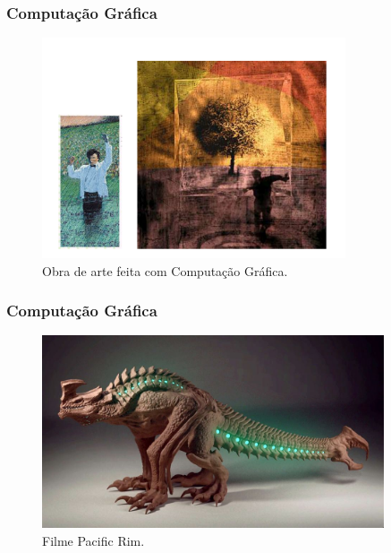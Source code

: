 \documentclass{beamer}
\begin{document}


\begin{frame}
\frametitle{Computação Gráfica}

	\begin{figure}[!h]
		\begin{center}
			\includegraphics[width=0.8\textwidth]{Figures/arte}
			\caption{Obra de arte feita com Computação Gráfica.}
		\end{center}
		
	\end{figure}

\end{frame}

\begin{frame}
\frametitle{Computação Gráfica}
	
	\begin{figure}[!h]
		\begin{center}
			\includegraphics[width=0.9\textwidth]{Figures/pr1}
			\caption{Filme Pacific Rim.}
		\end{center}
		
	\end{figure}
	

\end{frame}
\end{document}
